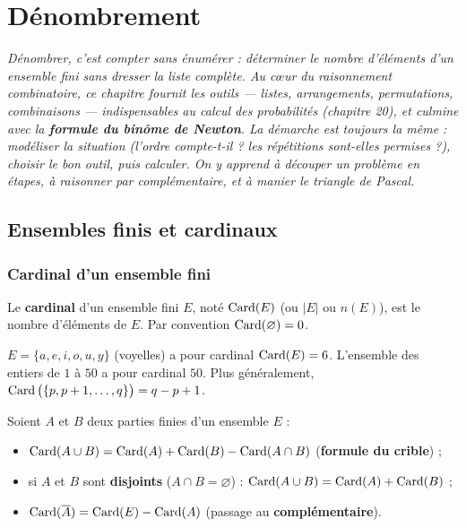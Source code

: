 \chapter{Dénombrement}

\noindent\textit{Dénombrer, c'est compter sans énumérer : déterminer le nombre d'éléments
d'un ensemble fini sans dresser la liste complète. Au c{\oe}ur du raisonnement
combinatoire, ce chapitre fournit les outils — listes, arrangements, permutations,
combinaisons — indispensables au calcul des probabilités (chapitre 20), et culmine avec
la \textbf{formule du binôme de Newton}. La démarche est toujours la même : modéliser
la situation (l'ordre compte-t-il ? les répétitions sont-elles permises ?), choisir
le bon outil, puis calculer. On y apprend à \og découper \fg{} un problème en étapes,
à raisonner par complémentaire, et à manier le triangle de Pascal.}
\vspace{8pt}

\section{Ensembles finis et cardinaux}

\subsection{Cardinal d'un ensemble fini}

\begin{definition}[Cardinal]
Le \textbf{cardinal} d'un ensemble fini $E$, noté $\operatorname{Card}(E)$ (ou $|E|$ ou $n(E)$), est le nombre d'éléments de $E$. Par convention $\operatorname{Card}(\varnothing)=0$.
\end{definition}

\begin{exemple}
$E=\{a,e,i,o,u,y\}$ (voyelles) a pour cardinal $\operatorname{Card}(E)=6$. L'ensemble des entiers de
$1$ à $50$ a pour cardinal $50$. Plus généralement, $\operatorname{Card}\big(\{p,p+1,\dots,q\}\big)=q-p+1$.
\end{exemple}

\begin{propriete}
Soient $A$ et $B$ deux parties finies d'un ensemble $E$ :
\begin{itemize}
\item $\operatorname{Card}(A\cup B)=\operatorname{Card}(A)+\operatorname{Card}(B)-\operatorname{Card}(A\cap B)$ \quad(\textbf{formule du crible}) ;
\item si $A$ et $B$ sont \textbf{disjoints} ($A\cap B=\varnothing$) : $\operatorname{Card}(A\cup B)=\operatorname{Card}(A)+\operatorname{Card}(B)$ ;
\item $\operatorname{Card}(\overline{A})=\operatorname{Card}(E)-\operatorname{Card}(A)$ \quad(passage au \textbf{complémentaire}).
\end{itemize}
\end{propriete}

